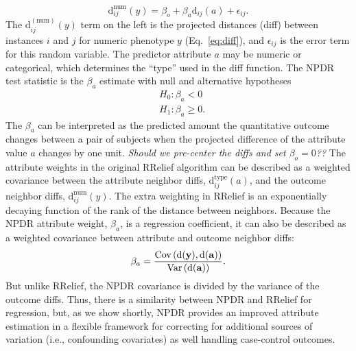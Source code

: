 \documentclass[10pt]{article}
\begin{document}
%
%
\begin{equation}\label{eq:lin_reg}
    \text{d}^{\text{num}}_{ij}(y) = \beta_{o} + \beta_{a} \text{d}_{ij}(a) + \epsilon_{ij}.
\end{equation}
The $\text{d}^{(\text{num})}_{ij}(y)$ term on the left is the projected distances (diff) between instances $i$ and $j$ for numeric phenotype $y$ (Eq.~\ref{eq:diff}), and $\epsilon_{ij}$ is the error term for this random variable. The predictor attribute $a$ may be numeric or categorical, which determines the ``type'' used in the diff function. The NPDR test statistic is the $\beta_a$ estimate with null and alternative hypotheses
\begin{equation}\label{eq:linreg_null}
\begin{aligned}
    & H_0: \beta_a < 0 \\
    & H_1: \beta_a \ge 0.
\end{aligned}
\end{equation}
The $\beta_a$ can be interpreted as the predicted amount the quantitative outcome changes between a pair of subjects when the projected difference of the attribute value $a$ changes by one unit. {\it Should we pre-center the diffs and set $\beta_o=0$??} The attribute weights in the original RRelief algorithm can be described as a weighted covariance between the attribute neighbor diffs, $\text{d}^{\text{type}}_{ij}(a)$, and the outcome neighbor diffs, $\text{d}^{\text{num}}_{ij}(y)$. The extra weighting in RRelief is an exponentially decaying function of the rank of the distance between neighbors. Because the NPDR attribute weight, $\beta_a$, is a regression coefficient, it can also be described as a weighted covariance between attribute and outcome neighbor diffs:
\begin{equation}
\beta_a = \frac{\text{Cov}\left( \bf{\text{d}}(\bf{y}), \bf{\text{d}}(\bf{a}) \right)} {\text{Var}\left( \bf{\text{d}}(\bf{a}) \right)}.
\end{equation}
But unlike RRelief, the NPDR covariance is divided by the variance of the outcome diffs. Thus, there is a similarity between NPDR and RRelief for regression, but, as we show shortly, NPDR provides an improved attribute estimation in a flexible framework for correcting for additional sources of variation (i.e., confounding covariates) as well handling case-control outcomes.   
\end{document}
